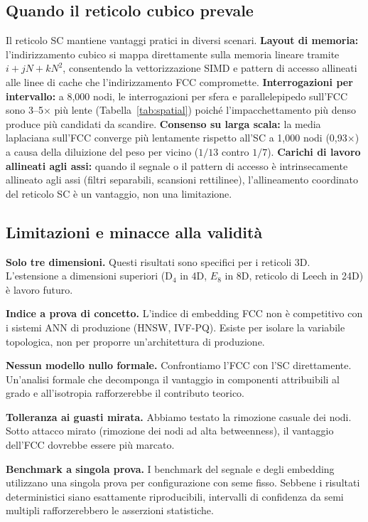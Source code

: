 \documentclass[11pt]{article}
\begin{document}
\subsection{Quando il reticolo cubico prevale}

Il reticolo SC mantiene vantaggi pratici in diversi scenari.
\textbf{Layout di memoria:} l'indirizzamento cubico si mappa direttamente
sulla memoria lineare tramite $i + jN + kN^2$, consentendo la
vettorizzazione SIMD e pattern di accesso allineati alle linee di cache
che l'indirizzamento FCC compromette. \textbf{Interrogazioni per
intervallo:} a 8{,}000 nodi, le interrogazioni per sfera e
parallelepipedo sull'FCC sono 3--5$\times$ pi\`u lente
(Tabella~\ref{tab:spatial}) poich\'e l'impacchettamento pi\`u denso
produce pi\`u candidati da scandire. \textbf{Consenso su larga scala:}
la media laplaciana sull'FCC converge pi\`u lentamente rispetto all'SC a
1{,}000 nodi (0,93$\times$) a causa della diluizione del peso per vicino
($1/13$ contro $1/7$). \textbf{Carichi di lavoro allineati agli assi:}
quando il segnale o il pattern di accesso \`e intrinsecamente allineato
agli assi (filtri separabili, scansioni rettilinee), l'allineamento
coordinato del reticolo SC \`e un vantaggio, non una limitazione.

\subsection{Limitazioni e minacce alla validit\`a}

\textbf{Solo tre dimensioni.} Questi risultati sono specifici per i
reticoli 3D. L'estensione a dimensioni superiori (D$_4$ in 4D, $E_8$ in
8D, reticolo di Leech in 24D) \`e lavoro futuro.

\textbf{Indice a prova di concetto.} L'indice di embedding FCC non
\`e competitivo con i sistemi ANN di produzione (HNSW, IVF-PQ). Esiste
per isolare la variabile topologica, non per proporre un'architettura di
produzione.

\textbf{Nessun modello nullo formale.} Confrontiamo l'FCC con l'SC
direttamente. Un'analisi formale che decomponga il vantaggio in componenti
attribuibili al grado e all'isotropia rafforzerebbe il contributo teorico.

\textbf{Tolleranza ai guasti mirata.} Abbiamo testato la rimozione
casuale dei nodi. Sotto attacco mirato (rimozione dei nodi ad alta
betweenness), il vantaggio dell'FCC dovrebbe essere pi\`u marcato.

\textbf{Benchmark a singola prova.} I benchmark del segnale e degli
embedding utilizzano una singola prova per configurazione con seme fisso.
Sebbene i risultati deterministici siano esattamente riproducibili,
intervalli di confidenza da semi multipli rafforzerebbero le asserzioni
statistiche.
\end{document}
